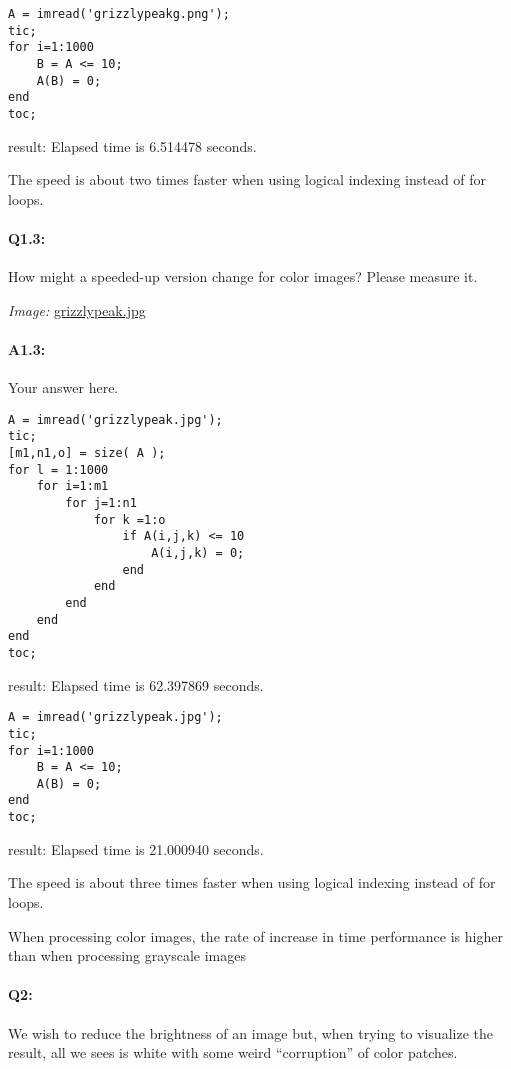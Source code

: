 \documentclass[11pt]{article}
\begin{document}
\begin{lstlisting}[style=Matlab-editor]
%using logical indexing
A = imread('grizzlypeakg.png');
tic;
for i=1:1000
    B = A <= 10;
    A(B) = 0;
end
toc;
\end{lstlisting}
result: Elapsed time is 6.514478 seconds.

The speed is about two times faster when using logical indexing instead of for loops.


\pagebreak
\paragraph{Q1.3:} How might a speeded-up version change for color images? Please measure it.

\emph{Image:} \href{grizzlypeak.jpg}{grizzlypeak.jpg}

\paragraph{A1.3:} Your answer here.

\begin{lstlisting}[style=Matlab-editor]
%using for loops
A = imread('grizzlypeak.jpg');
tic;
[m1,n1,o] = size( A );
for l = 1:1000
    for i=1:m1
        for j=1:n1
            for k =1:o
                if A(i,j,k) <= 10
                    A(i,j,k) = 0;
                end
            end
        end
    end
end
toc;
\end{lstlisting}
result: Elapsed time is 62.397869 seconds.

\begin{lstlisting}[style=Matlab-editor]
%using logical indexing
A = imread('grizzlypeak.jpg');
tic;
for i=1:1000
    B = A <= 10;
    A(B) = 0;
end
toc;
\end{lstlisting}
result: Elapsed time is 21.000940 seconds.

The speed is about three times faster when using logical indexing instead of for loops. 

When processing color images, the rate of increase in time performance is higher than when processing grayscale images



\pagebreak
\paragraph{Q2:} We wish to reduce the brightness of an image but, when trying to visualize the result, all we sees is white with some weird ``corruption'' of color patches.
\end{document}
